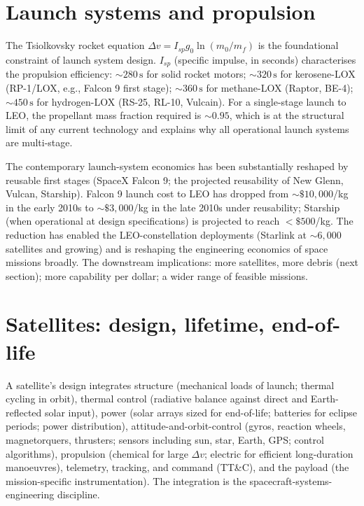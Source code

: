 \section{Launch systems and propulsion}

The Tsiolkovsky rocket equation $\Delta v = I_{sp} g_0 \ln(m_0/m_f)$ is the foundational constraint of launch system design. $I_{sp}$ (specific impulse, in seconds) characterises the propulsion efficiency: $\sim 280\,\text{s}$ for solid rocket motors; $\sim 320\,\text{s}$ for kerosene-LOX (RP-1/LOX, e.g., Falcon 9 first stage); $\sim 360\,\text{s}$ for methane-LOX (Raptor, BE-4); $\sim 450\,\text{s}$ for hydrogen-LOX (RS-25, RL-10, Vulcain). For a single-stage launch to LEO, the propellant mass fraction required is $\sim 0.95$, which is at the structural limit of any current technology and explains why all operational launch systems are multi-stage.

The contemporary launch-system economics has been substantially reshaped by reusable first stages (SpaceX Falcon 9; the projected reusability of New Glenn, Vulcan, Starship). Falcon 9 launch cost to LEO has dropped from $\sim \$10{,}000$/kg in the early 2010s to $\sim \$3{,}000$/kg in the late 2010s under reusability; Starship (when operational at design specifications) is projected to reach $<\$500$/kg. The reduction has enabled the LEO-constellation deployments (Starlink at $\sim 6{,}000$ satellites and growing) and is reshaping the engineering economics of space missions broadly. The downstream implications: more satellites, more debris (next section); more capability per dollar; a wider range of feasible missions.

\section{Satellites: design, lifetime, end-of-life}

A satellite's design integrates structure (mechanical loads of launch; thermal cycling in orbit), thermal control (radiative balance against direct and Earth-reflected solar input), power (solar arrays sized for end-of-life; batteries for eclipse periods; power distribution), attitude-and-orbit-control (gyros, reaction wheels, magnetorquers, thrusters; sensors including sun, star, Earth, GPS; control algorithms), propulsion (chemical for large $\Delta v$; electric for efficient long-duration manoeuvres), telemetry, tracking, and command (TT\&C), and the payload (the mission-specific instrumentation). The integration is the spacecraft-systems-engineering discipline.

